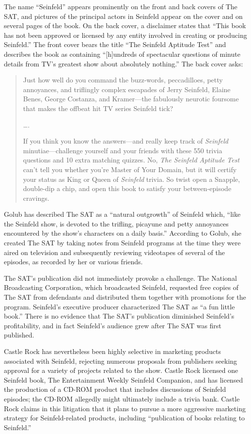 The name ``Seinfeld'' appears prominently on the front and back covers of The
SAT, and pictures of the principal actors in Seinfeld appear on the cover and
on several pages of the book. On the back cover, a disclaimer states that
``This book has not been approved or licensed by any entity involved in
creating or producing Seinfeld.'' The front cover bears the title ``The
Seinfeld Aptitude Test'' and describes the book as containing ``[h]undreds of
spectacular questions of minute details from TV's greatest show about
absolutely nothing.'' The back cover asks:
\begin{quotation}
Just how well do you command the buzz-words, peccadilloes, petty annoyances, and
triflingly complex escapades of Jerry Seinfeld, Elaine Benes, George Costanza,
and Kramer---the fabulously neurotic foursome that makes the offbeat hit TV
series Seinfeld tick?

\ldots.

If you think you know the answers---and really keep track of \textit{Seinfeld}
minutiae---challenge yourself and your friends with these 550 trivia
questions and 10 extra matching quizzes. No, \textit{The Seinfeld Aptitude
Test} can't tell you whether you're Master of Your Domain, but it will certify
your status as King or Queen of \textit{Seinfeld} trivia. So twist open a
Snapple, double-dip a chip, and open this book to satisfy your between-episode
cravings.
\end{quotation}

Golub has described The SAT as a ``natural outgrowth'' of Seinfeld which, ``like
the Seinfeld show, is devoted to the trifling, picayune and petty annoyances
encountered by the show's characters on a daily basis.'' According to Golub,
she created The SAT by taking notes from Seinfeld programs at the time they
were aired on television and subsequently reviewing videotapes of several of
the episodes, as recorded by her or various friends.

The SAT's publication did not immediately provoke a challenge. The National
Broadcasting Corporation, which broadcasted Seinfeld, requested free copies of
The SAT from defendants and distributed them together with promotions for the
program. Seinfeld's executive producer characterized The SAT as ``a fun little
book.'' There is no evidence that The SAT's publication diminished Seinfeld's
profitability, and in fact Seinfeld's audience grew after The SAT was first
published.

Castle Rock has nevertheless been highly selective in marketing products
associated with Seinfeld, rejecting numerous proposals from publishers seeking
approval for a variety of projects related to the show. Castle Rock licensed
one Seinfeld book, The Entertainment Weekly Seinfeld Companion, and has
licensed the production of a CD-ROM product that includes discussions of
Seinfeld episodes; the CD-ROM allegedly might ultimately include a trivia bank.
Castle Rock claims in this litigation that it plans to pursue a more aggressive
marketing strategy for Seinfeld-related products, including ``publication of
books relating to Seinfeld.''

